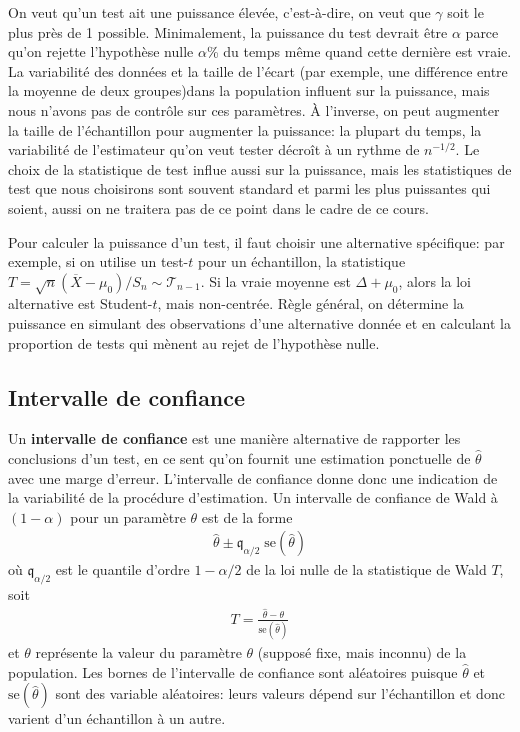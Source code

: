 \documentclass[
  11pt,
  letterpaper,
]{book}
\begin{document}
On veut qu'un test ait une puissance élevée, c'est-à-dire, on veut que \(\gamma\) soit le plus près de 1 possible. Minimalement, la puissance du test devrait être \(\alpha\) parce qu'on rejette l'hypothèse nulle \(\alpha\)\% du temps même quand cette dernière est vraie. La variabilité des données et la taille de l'écart (par exemple, une différence entre la moyenne de deux groupes)dans la population influent sur la puissance, mais nous n'avons pas de contrôle sur ces paramètres. À l'inverse, on peut augmenter la taille de l'échantillon pour augmenter la puissance: la plupart du temps, la variabilité de l'estimateur qu'on veut tester décroît à un rythme de \(n^{-1/2}\). Le choix de la statistique de test influe aussi sur la puissance, mais les statistiques de test que nous choisirons sont souvent standard et parmi les plus puissantes qui soient, aussi on ne traitera pas de ce point dans le cadre de ce cours.

Pour calculer la puissance d'un test, il faut choisir une alternative spécifique: par exemple, si on utilise un test-\(t\) pour un échantillon, la statistique \(T=\sqrt{n}(\overline{X}-\mu_0)/S_n \sim \mathcal{T}_{n-1}\). Si la vraie moyenne est \(\Delta + \mu_0\), alors la loi alternative est Student-\(t\), mais non-centrée. Règle général, on détermine la puissance en simulant des observations d'une alternative donnée et en calculant la proportion de tests qui mènent au rejet de l'hypothèse nulle.

\hypertarget{intervalle-de-confiance}{%
\subsection{Intervalle de confiance}\label{intervalle-de-confiance}}

Un \textbf{intervalle de confiance} est une manière alternative de rapporter les conclusions d'un test, en ce sent qu'on fournit une estimation ponctuelle de \(\hat{\theta}\) avec une marge d'erreur. L'intervalle de confiance donne donc une indication de la variabilité de la procédure d'estimation. Un intervalle de confiance de Wald à \((1-\alpha)\) pour un paramètre \(\theta\) est de la forme
\begin{align*}
\widehat{\theta} \pm \mathfrak{q}_{\alpha/2} \; \mathrm{se}(\widehat{\theta})
\end{align*}
où \(\mathfrak{q}_{\alpha/2}\) est le quantile d'ordre \(1-\alpha/2\) de la loi nulle de la statistique de Wald \(T\), soit
\begin{align*}
T =\frac{\widehat{\theta}-\theta}{\mathrm{se}(\widehat{\theta})}
\end{align*}
et \(\theta\) représente la valeur du paramètre \(\theta\) (supposé fixe, mais inconnu) de la population. Les bornes de l'intervalle de confiance sont aléatoires puisque \(\widehat{\theta}\) et \(\mathrm{se}(\widehat{\theta})\) sont des variable aléatoires: leurs valeurs dépend sur l'échantillon et donc varient d'un échantillon à un autre.
\end{document}
